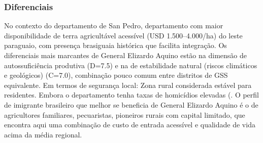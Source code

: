 \subsubsection*{Diferenciais}\label{dif-general-elizardo-aquino-0204}
No contexto do departamento de San Pedro, departamento com maior disponibilidade de terra agricultável acessível (USD 1.500–4.000/ha) do leste paraguaio, com presença brasiguaia histórica que facilita integração. Os diferenciais mais marcantes de General Elizardo Aquino estão na dimensão de autossuficiência produtiva (D=7.5) e na de estabilidade natural (riscos climáticos e geológicos) (C=7.0), combinação pouco comum entre distritos de GSS equivalente. Em termos de segurança local: Zona rural considerada estável para residentes. Embora o departamento tenha taxas de homicídios elevadas (. O perfil de imigrante brasileiro que melhor se beneficia de General Elizardo Aquino é o de agricultores familiares, pecuaristas, pioneiros rurais com capital limitado, que encontra aqui uma combinação de custo de entrada acessível e qualidade de vida acima da média regional.
